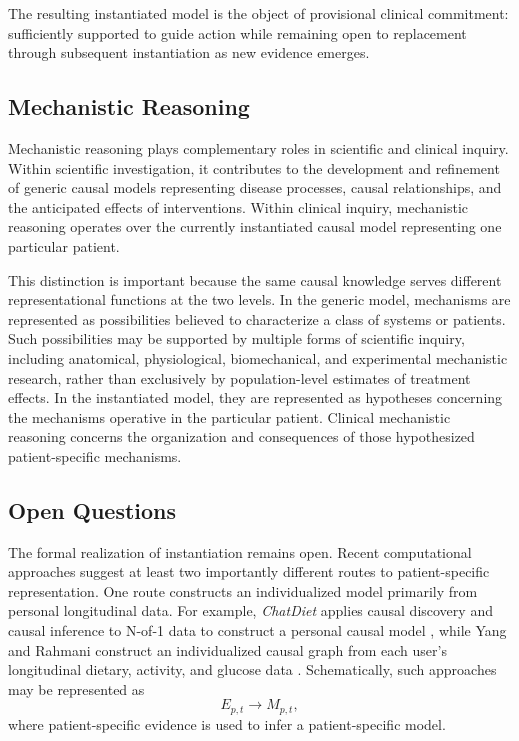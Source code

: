 \documentclass[11pt]{article}
\begin{document}
The resulting instantiated model is the object of provisional clinical commitment: sufficiently supported to guide action while remaining open to replacement through subsequent instantiation as new evidence emerges.

\subsection{Mechanistic Reasoning}

Mechanistic reasoning plays complementary roles in scientific and clinical inquiry. Within scientific investigation, it contributes to the development and refinement of generic causal models representing disease processes, causal relationships, and the anticipated effects of interventions. Within clinical inquiry, mechanistic reasoning operates over the currently instantiated causal model representing one particular patient.

This distinction is important because the same causal knowledge serves different representational functions at the two levels. In the generic model, mechanisms are represented as possibilities believed to characterize a class of systems or patients. Such possibilities may be supported by multiple forms of scientific inquiry, including anatomical, physiological, biomechanical, and experimental mechanistic research, rather than exclusively by population-level estimates of treatment effects. In the instantiated model, they are represented as hypotheses concerning the mechanisms operative in the particular patient. Clinical mechanistic reasoning concerns the organization and consequences of those hypothesized patient-specific mechanisms.

\subsection{Open Questions}

The formal realization of instantiation remains open. Recent computational approaches suggest at least two importantly different routes to patient-specific representation. One route constructs an individualized model primarily from personal longitudinal data. For example, \textit{ChatDiet} applies causal discovery and causal inference to N-of-1 data to construct a personal causal model \parencite{yang_chatdiet_2024}, while Yang and Rahmani construct an individualized causal graph from each user's longitudinal dietary, activity, and glucose data \parencite{yang_personalized_2025}. Schematically, such approaches may be represented as
\[
E_{p,t} \longrightarrow M_{p,t},
\]
where patient-specific evidence is used to infer a patient-specific model.
\end{document}
